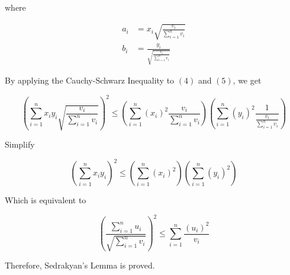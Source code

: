 \documentclass[letterpaper]{article}
\begin{document}
\begin{enumerate}
        where

        \begin{align}
            a_i & = x_i\sqrt{\frac{v_i}{\sum_{i=1}^{n}v_i}}          \\
            b_i & = \frac{y_i}{\sqrt{\frac{v_i}{\sum_{i=1}^{n}v_i}}}
        \end{align}

        By applying the Cauchy-Schwarz Inequality to $(4)$ and $(5)$, we get

        \begin{equation}
            \left(\sum_{i=1}^{n}x_i y_i \sqrt{\frac{v_i}{\sum_{i=1}^{n}v_i}}\right)^2 \leq \left(\sum_{i=1}^{n}(x_i)^2 \frac{v_i}{\sum_{i=1}^{n}v_i}\right) \left(\sum_{i=1}^{n}(y_i)^2 \frac{1}{\frac{v_i}{\sum_{i=1}^{n}v_i}}\right)
        \end{equation}

        Simplify

        \begin{equation}
            \left(\sum_{i=1}^{n}x_i y_i\right)^2 \leq \left(\sum_{i=1}^{n}(x_i)^2\right) \left(\sum_{i=1}^{n}(y_i)^2\right)
        \end{equation}

        Which is equivalent to

        \begin{equation}
            \left(\frac{\sum_{i=1}^{n}u_i}{\sqrt{\sum_{i=1}^{n}v_i}}\right)^2 \leq \sum_{i=1}^{n}\frac{(u_i)^2}{v_i}
        \end{equation}

        Therefore, Sedrakyan's Lemma is proved.
\end{enumerate}
\end{document}
